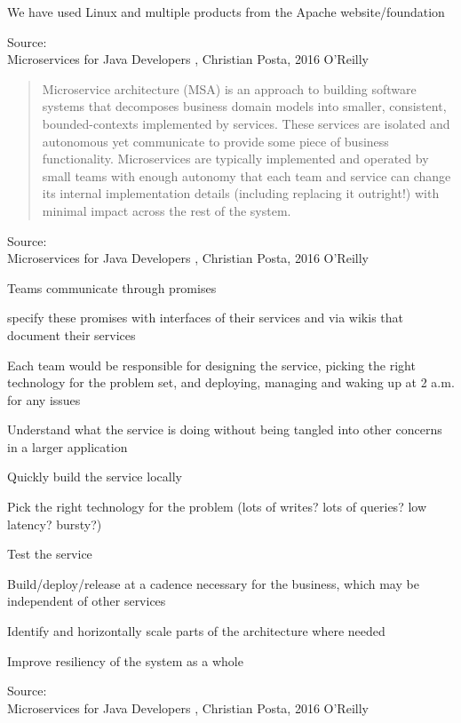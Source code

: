 \documentclass[Screen16to9,17pt]{foils}
\begin{document}
\begin{list2}
\item We have used Linux and multiple products from the Apache website/foundation
\end{list2}
Source: {\footnotesize\\
Microservices for Java Developers , Christian Posta, 2016 O’Reilly}






\begin{quote}\small
  Microservice architecture (MSA) is an approach to building software systems that decomposes business domain models into smaller,
  consistent, bounded-contexts implemented by services. These services are isolated and autonomous yet communicate to provide some
  piece of business functionality. Microservices are typically implemented and operated by small teams with enough autonomy that
  each team and service can change its internal implementation
  details (including replacing it outright!) with minimal impact across
  the rest of the system.
\end{quote}

Source: {\footnotesize\\
Microservices for Java Developers , Christian Posta, 2016 O’Reilly}







\begin{list2}
\item Teams communicate through promises
\item specify these promises with interfaces
of their services and via wikis that document their services
\item Each team would be responsible for designing the service, picking
the right technology for the problem set, and deploying, managing
and waking up at 2 a.m. for any issues
\item Understand what the service is doing without being tangled into
other concerns in a larger application
\item Quickly build the service locally
\item Pick the right technology for the problem (lots of writes? lots of
queries? low latency? bursty?)
\item Test the service
\item Build/deploy/release at a cadence necessary for the business,
which may be independent of other services
\item Identify and horizontally scale parts of the architecture where
needed
\item Improve resiliency of the system as a whole



\end{list2}
Source: {\footnotesize\\
Microservices for Java Developers , Christian Posta, 2016 O’Reilly}
\end{document}
